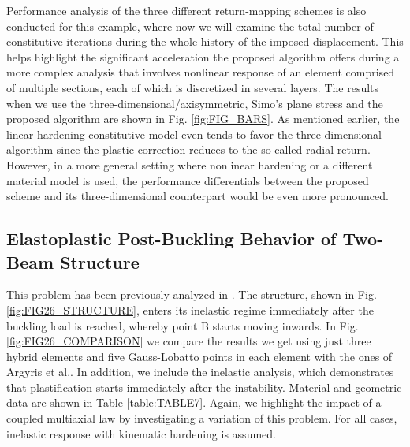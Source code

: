 Performance analysis of the three different return-mapping schemes is also 
conducted for this example, where now we will examine the total number of 
constitutive iterations during the whole history of the imposed displacement. 
This helps highlight the significant acceleration the proposed algorithm offers 
during a more complex analysis that involves nonlinear response of an element 
comprised of multiple sections, each of which is discretized in several 
layers. The results when we use the three-dimensional/axisymmetric, Simo's 
plane stress and the proposed algorithm are shown in Fig. \ref{fig:FIG_BARS}. 
As mentioned earlier, the linear hardening constitutive model even tends to 
favor the 
three-dimensional algorithm since the plastic correction reduces to the 
so-called radial return. However, in a 
more general setting where nonlinear hardening or a different material model is 
used, the performance differentials between the proposed scheme and its 
three-dimensional counterpart would be even more pronounced.

\subsection{Elastoplastic Post-Buckling Behavior of Two-Beam Structure}

This problem has been previously analyzed in \cite{Argyris1982,Ridha1971}. The 
structure, shown in Fig. \ref{fig:FIG26_STRUCTURE}, enters its inelastic regime 
immediately after the buckling 
load is reached, whereby point B starts moving inwards. In 
Fig. \ref{fig:FIG26_COMPARISON} we compare the 
results we get using just three hybrid elements and five Gauss-Lobatto points 
in each 
element with the ones of Argyris et al.\cite{Argyris1982}. In addition, we 
include the 
inelastic analysis, which demonstrates that plastification starts immediately 
after the instability. Material and geometric data are shown in 
Table \ref{table:TABLE7}. Again, we highlight the impact of a coupled 
multiaxial law by 
investigating a variation of this problem. For all cases, inelastic response 
with kinematic hardening is assumed. 



